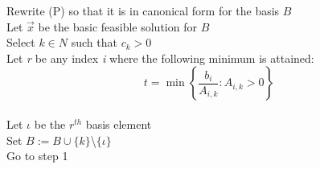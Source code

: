\begin{exercise}[]
\begin{solution}
\begin{algorithm}[H]
  Rewrite (P) so that it is in canonical form for the basis $B$\\
  Let $\vec{x}$ be the basic feasible solution for $B$\\
  Select $k \in N$ such that $c_k > 0$\\
  Let \emph{r} be any index \emph{i} where the following minimum is attained:
  \begin{equation}
  t = \operatorname{min}\left\{\frac{b_i}{A_{i,k}}:A_{i,k} > 0\right\}
  \end{equation}
  \\
  Let $\iota$ be the $r^{th}$ basis element\\
  Set $B:=B\cup\{k\}$\textbackslash$\{\iota\}$\\
  Go to step 1
  \end{algorithm}
  \end{solution}
  \label{ex4}
\end{exercise}